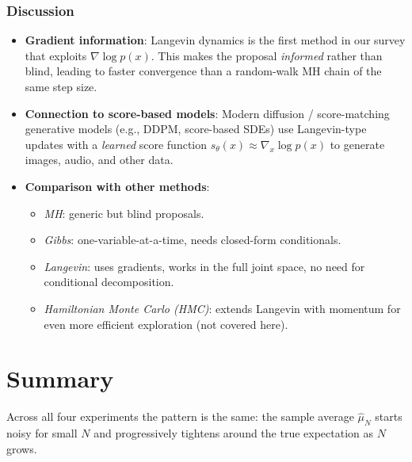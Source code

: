 \documentclass[12pt, a4paper]{article}
\begin{document}
\subsubsection{Discussion}

\begin{itemize}
    \item \textbf{Gradient information}: Langevin dynamics is
          the first method in our survey that exploits
          $\nabla \log p(x)$.  This makes the proposal
          \emph{informed} rather than blind, leading to
          faster convergence than a random-walk MH chain of
          the same step size.
    \item \textbf{Connection to score-based models}:
          Modern diffusion / score-matching generative models
          (e.g., DDPM, score-based SDEs) use Langevin-type
          updates with a \emph{learned} score function
          $s_\theta(x) \approx \nabla_x \log p(x)$ to
          generate images, audio, and other data.
    \item \textbf{Comparison with other methods}:
          \begin{itemize}
              \item \emph{MH}: generic but blind proposals.
              \item \emph{Gibbs}: one-variable-at-a-time,
                    needs closed-form conditionals.
              \item \emph{Langevin}: uses gradients, works in
                    the full joint space, no need for
                    conditional decomposition.
              \item \emph{Hamiltonian Monte Carlo (HMC)}:
                    extends Langevin with momentum for
                    even more efficient exploration
                    (not covered here).
          \end{itemize}
\end{itemize}

\section{Summary}
\label{sec:summary}

Across all four experiments the pattern is the same: the sample average
$\hat{\mu}_N$ starts noisy for small $N$ and progressively tightens
around the true expectation as $N$ grows.
\end{document}
